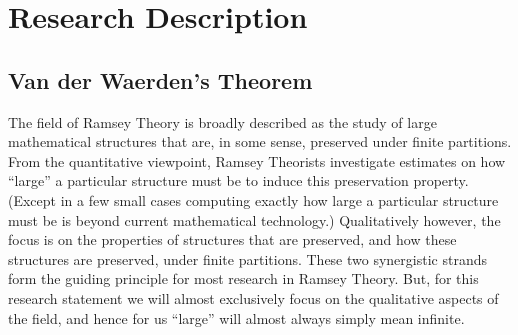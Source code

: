 \documentclass[12pt]{article}
\theoremstyle{plain}
\begin{document}
\section{Research Description}
\subsection{Van der Waerden's Theorem}
The field of Ramsey Theory is broadly described as the study of large mathematical structures that are, in some sense, preserved under finite partitions.
From the quantitative viewpoint, Ramsey Theorists investigate estimates on how ``large'' a particular structure must be to induce this preservation property.
(Except in a few small cases computing exactly how large a particular structure must be is beyond current mathematical technology.)
Qualitatively however, the focus is on the properties of structures that are preserved, and how these structures are preserved, under finite partitions.
These two synergistic strands form the guiding principle for most research in Ramsey Theory.
But, for this research statement we will almost exclusively focus on the qualitative aspects of the field, and hence for us ``large'' will almost always simply mean infinite.



\end{document}
